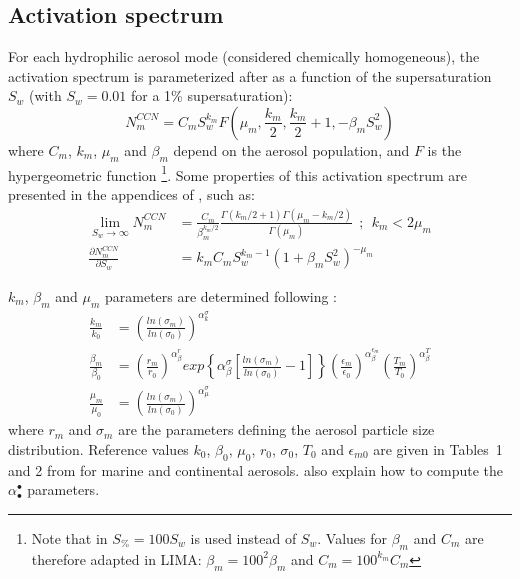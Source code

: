 \subsection{Activation spectrum}

For each hydrophilic aerosol mode (considered chemically homogeneous), the activation spectrum is parameterized after \citet{Cohard1998} as a function of the supersaturation $S_w$  (with $S_w=0.01$ for a 1\% supersaturation):
\begin{equation}
\label{SpectreCPB98}
 N_m^{CCN} = C_m S_w^{k_m} F(\mu_m,\frac{k_m}{2},\frac{k_m}{2}+1,-\beta_m S_w^2)
\end{equation}
where $C_m$, $k_m$, $\mu_m$ and $\beta_m$ depend on the aerosol population, and $F$ is the hypergeometric function \citep{Gradshteyn1965}\footnote{Note that in \citet{Cohard1998} $S_\%=100 S_w$ is used instead of $S_w$. Values for $\beta_m$ and $C_m$ are therefore adapted in LIMA: $\beta_m = 100^2 \beta_m$ and $C_m = 100^{k_m} C_m$}. Some properties of this activation spectrum are presented in the appendices of \citet{Cohard2000spectre}, such as:
\begin{align}
  \label{limiteCCN}
 \lim_{S_w \to \infty} N_m^{CCN} &= \frac{C_m}{\beta_m^{k_m/2}}\frac{\Gamma(k_m/2+1)\Gamma(\mu_m-k_m/2)}{\Gamma(\mu_m)} ~~;~~ k_m<2\mu_m \\
 \frac{\partial N_m^{CCN}}{\partial S_w} &= k_m C_m S_w^{k_m-1} (1+\beta_m S_w^2)^{-\mu_m}
\end{align}

$k_m$, $\beta_m$ and $\mu_m$ parameters are determined following \citet{Cohard2000spectre}:
\begin{align}
 \frac{k_m}{k_0} &= \left(\frac{ln(\sigma_m)}{ln(\sigma_0)}\right)^{\alpha_k^\sigma} \\
% 
 \frac{\beta_m}{\beta_0} &= \left(\frac{r_m}{r_0}\right)^{\alpha_\beta^r}  exp\left\{\alpha_\beta^\sigma \left[\frac{ln(\sigma_m)}{ln(\sigma_0)}-1\right]\right\}  \left(\frac{\epsilon_m}{\epsilon_{0}}\right)^{\alpha_\beta^{\epsilon_m}}  \left(\frac{T_m}{T_0}\right)^{\alpha_\beta^T} \\
% 
 \frac{\mu_m}{\mu_0} &= \left(\frac{ln(\sigma_m)}{ln(\sigma_0)}\right)^{\alpha_\mu^\sigma}
\end{align}
where $r_m$ and $\sigma_m$ are the parameters defining the aerosol particle size distribution. Reference values $k_0$, $\beta_0$, $\mu_0$, $r_0$, $\sigma_0$, $T_0$ and $\epsilon_{m0}$ are given in Tables~1 and 2 from \citet{Cohard2000spectre} for marine and continental aerosols. \citet{Cohard2000spectre} also explain how to compute the $\alpha_\bullet^\bullet$ parameters.


